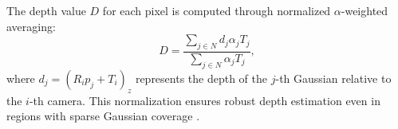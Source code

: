 The depth value \( D \) for each pixel is computed through normalized \(\alpha\)-weighted averaging:
\begin{equation}
D = \frac{\sum_{j \in N} d_j \alpha_j T_j}{\sum_{j \in N} \alpha_j T_j},
\end{equation}
where \( d_j = (R_i p_j + T_i)_z \) represents the depth of the \( j \)-th Gaussian relative to the \( i \)-th camera. This normalization ensures robust depth estimation even in regions with sparse Gaussian coverage \citep{chung2024depth}.
